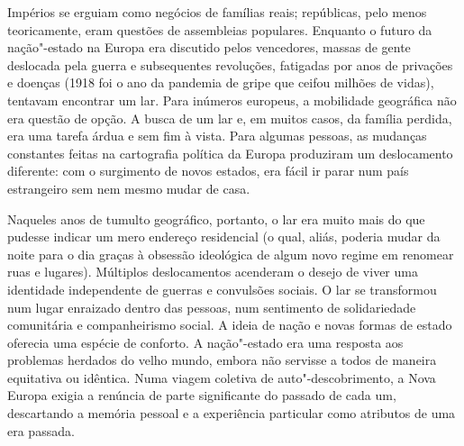 Impérios se erguiam como negócios de famílias reais; repúblicas, pelo
menos teoricamente, eram questões de assembleias populares. Enquanto o
futuro da nação"-estado na Europa era discutido pelos vencedores, massas
de gente deslocada pela guerra e subsequentes revoluções, fatigadas por
anos de privações e doenças (1918 foi o ano da pandemia de gripe que
ceifou milhões de vidas), tentavam encontrar um lar. Para inúmeros
europeus, a mobilidade geográfica não era questão de opção. A busca de
um lar e, em muitos casos, da família perdida, era uma tarefa árdua e
sem fim à vista. Para algumas pessoas, as mudanças constantes feitas na
cartografia política da Europa produziram um deslocamento diferente: com
o surgimento de novos estados, era fácil ir parar num país estrangeiro
sem nem mesmo mudar de casa.

Naqueles anos de tumulto geográfico, portanto, o lar era muito mais do
que pudesse indicar um mero endereço residencial (o qual, aliás, poderia
mudar da noite para o dia graças à obsessão ideológica de algum novo
regime em renomear ruas e lugares). Múltiplos deslocamentos acenderam o
desejo de viver uma identidade independente de guerras e convulsões
sociais. O lar se transformou num lugar enraizado dentro das pessoas,
num sentimento de solidariedade comunitária e companheirismo social. A
ideia de nação e novas formas de estado oferecia uma espécie de
conforto. A nação"-estado era uma resposta aos problemas herdados do
velho mundo, embora não servisse a todos de maneira equitativa ou
idêntica. Numa viagem coletiva de auto"-descobrimento, a Nova Europa
exigia a renúncia de parte significante do passado de cada um,
descartando a memória pessoal e a experiência particular como atributos
de uma era passada.

